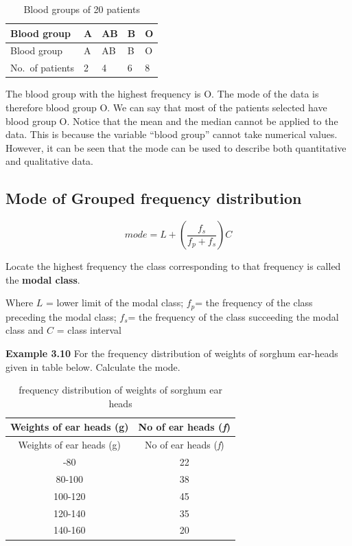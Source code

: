 \documentclass[
]{book}
\begin{document}
\begin{longtable}[]{@{}lllll@{}}
\caption{\label{tab:Blood} Blood groups of 20 patients}\tabularnewline
\toprule\noalign{}
Blood group & A & AB & B & O \\
\midrule\noalign{}
\endfirsthead
\toprule\noalign{}
Blood group & A & AB & B & O \\
\midrule\noalign{}
\endhead
\bottomrule\noalign{}
\endlastfoot
No.~of patients & 2 & 4 & 6 & 8 \\
\end{longtable}

The blood group with the highest frequency is O. The mode of the data is
therefore blood group O. We can say that most of the patients selected
have blood group O. Notice that the mean and the median cannot be
applied to the data. This is because the variable ``blood group'' cannot
take numerical values. However, it can be seen that the mode can be used
to describe both quantitative and qualitative data.

\hypertarget{mode-of-grouped-frequency-distribution}{%
\subsection{Mode of Grouped frequency distribution}\label{mode-of-grouped-frequency-distribution}}

\[mode = L + \left( \frac{f_{s}}{f_{p} + f_{s}} \right)C\]

Locate the highest frequency the class corresponding to that frequency
is called the \textbf{modal class}.

Where \(L\) = lower limit of the modal class; \(f_{p}\)= the frequency of
the class preceding the modal class; \(f_{s}\)= the frequency of the class
succeeding the modal class and \(C\) = class interval

\textbf{Example 3.10} For the frequency distribution of weights of sorghum
ear-heads given in table below. Calculate the mode.

\begin{longtable}[]{@{}cc@{}}
\caption{\label{tab:earhead}frequency distribution of weights of sorghum ear heads}\tabularnewline
\toprule\noalign{}
Weights of ear heads (g) & No of ear heads (\emph{f}) \\
\midrule\noalign{}
\endfirsthead
\toprule\noalign{}
Weights of ear heads (g) & No of ear heads (\emph{f}) \\
\midrule\noalign{}
\endhead
\bottomrule\noalign{}
\endlastfoot
60-80 & 22 \\
80-100 & 38 \\
100-120 & 45 \\
120-140 & 35 \\
140-160 & 20 \\
\end{longtable}
\end{document}
